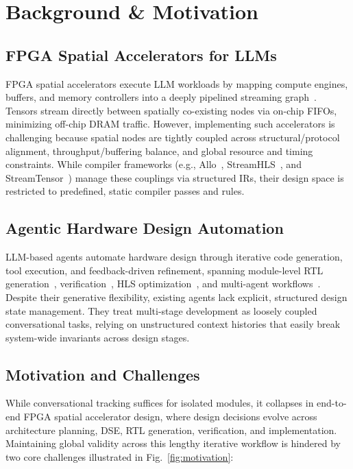 \documentclass[9pt,conference]{IEEEtran}
\begin{document}
\section{Background \& Motivation}

\subsection{FPGA Spatial Accelerators for LLMs}
FPGA spatial accelerators execute LLM workloads by mapping compute engines, buffers, and memory controllers into a deeply pipelined streaming graph~\cite{streamtensor,allo,streamhls}. Tensors stream directly between spatially co-existing nodes via on-chip FIFOs, minimizing off-chip DRAM traffic. However, implementing such accelerators is challenging because spatial nodes are tightly coupled across structural/protocol alignment, throughput/buffering balance, and global resource and timing constraints. While compiler frameworks (e.g., Allo~\cite{allo}, StreamHLS~\cite{streamhls}, and StreamTensor~\cite{streamtensor}) manage these couplings via structured IRs, their design space is restricted to predefined, static compiler passes and rules.

\subsection{Agentic Hardware Design Automation}
LLM-based agents automate hardware design through iterative code generation, tool execution, and feedback-driven refinement, spanning module-level RTL generation~\cite{mage,rtlfixer}, verification~\cite{assertllm,correctbench}, HLS optimization~\cite{hlspilot}, and multi-agent workflows~\cite{mahl,gpt4aigchip,designconductor2,rtlsquad}. Despite their generative flexibility, existing agents lack explicit, structured design state management. They treat multi-stage development as loosely coupled conversational tasks, relying on unstructured context histories that easily break system-wide invariants across design stages.

\subsection{Motivation and Challenges}
While conversational tracking suffices for isolated modules, it collapses in end-to-end FPGA spatial accelerator design, where design decisions evolve across architecture planning, DSE, RTL generation, verification, and implementation. Maintaining global validity across this lengthy iterative workflow is hindered by two core challenges illustrated in Fig.~\ref{fig:motivation}:
\end{document}
